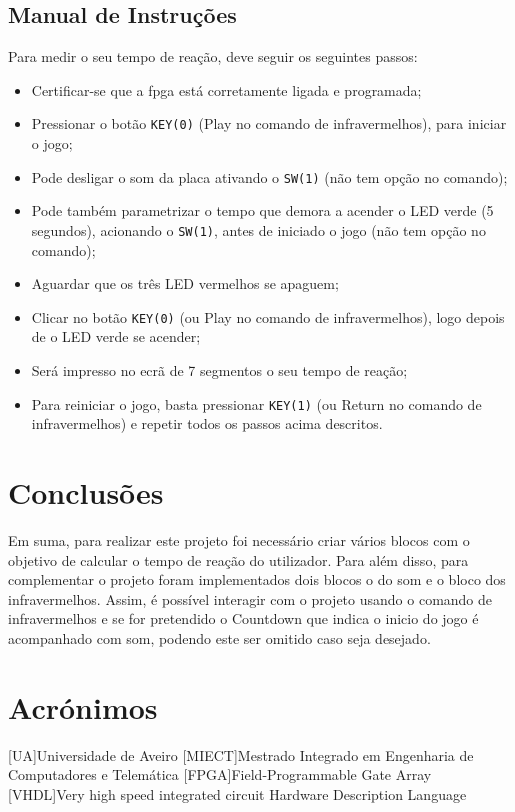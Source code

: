 \documentclass[a4paper,11pt,onecolumn]{report}
\begin{document}
\section{Manual de Instruções}
Para medir o seu tempo de reação, deve seguir os seguintes passos:
\begin{itemize}
\item Certificar-se que a \ac{fpga} está corretamente ligada e programada;
\item Pressionar o botão \texttt{KEY(0)} (Play no comando de infravermelhos), para iniciar o jogo;
\item Pode desligar o som da placa ativando o \texttt{SW(1)} (não tem opção no comando);
\item Pode também parametrizar o tempo que demora a acender o LED verde (5 segundos), acionando o \texttt{SW(1)}, antes de iniciado o jogo (não tem opção no comando);
\item Aguardar que os três LED vermelhos se apaguem;
\item Clicar no botão \texttt{KEY(0)} (ou Play no comando de infravermelhos), logo depois de o LED verde se acender;
\item Será impresso no ecrã de 7 segmentos o seu tempo de reação;
\item Para reiniciar o jogo, basta pressionar \texttt{KEY(1)} (ou Return no comando de infravermelhos) e repetir todos os passos acima descritos.
\end{itemize}


\chapter{Conclusões}
\label{chap.conclusao}
Em suma, para realizar este projeto foi necessário criar vários blocos com o objetivo de calcular o tempo de reação do utilizador. Para além disso, para complementar o projeto foram implementados dois blocos o do som e o bloco dos infravermelhos. Assim, é possível interagir com o projeto usando o comando de infravermelhos e se for pretendido o Countdown que indica o inicio do jogo é acompanhado com som, podendo este ser omitido caso seja desejado. 


\chapter*{Acrónimos}
\begin{acronym}
[UA]{Universidade de Aveiro}
[MIECT]{Mestrado Integrado em Engenharia de Computadores e Telemática}
[FPGA]{Field-Programmable Gate Array}
[VHDL]{Very high speed integrated circuit Hardware Description Language}

\end{acronym}


\end{document}
